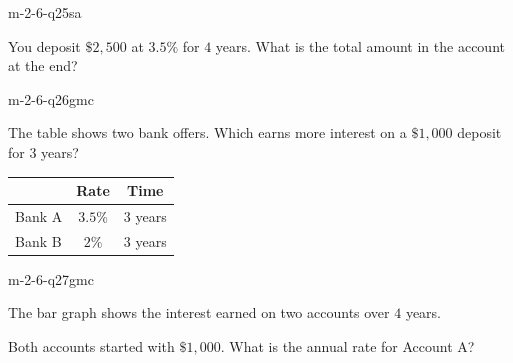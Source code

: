 \begin{practiceQuestion}{m-2-6-q25}{sa}
\begin{questionText}
You deposit $\$2{,}500$ at $3.5\%$ for $4$ years. What is the total amount in the account at the end?
\end{questionText}
\end{practiceQuestion}


\begin{practiceQuestion}{m-2-6-q26}{gmc}
\begin{questionText}
The table shows two bank offers. Which earns more interest on a $\$1{,}000$ deposit for $3$ years?

\begin{center}
\begin{tabular}{|l|c|c|}
\hline
 & \textbf{Rate} & \textbf{Time} \\
\hline
Bank A & $3.5\%$ & $3$ years \\
\hline
Bank B & $2\%$ & $3$ years \\
\hline
\end{tabular}
\end{center}
\end{questionText}
\end{practiceQuestion}

\begin{practiceQuestion}{m-2-6-q27}{gmc}
\begin{questionText}
The bar graph shows the interest earned on two accounts over $4$ years.

\begin{center}
\end{center}

Both accounts started with $\$1{,}000$. What is the annual rate for Account A?
\end{questionText}
\end{practiceQuestion}

